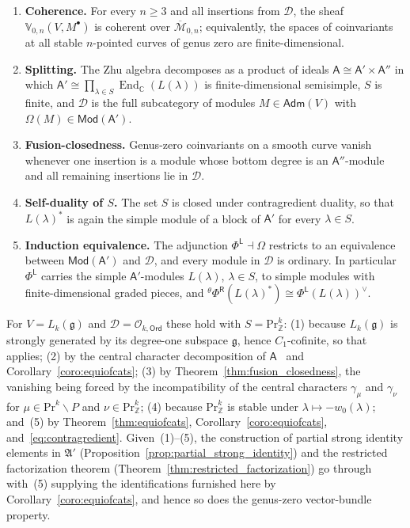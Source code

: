\documentclass[12pt,a4paper,reqno]{amsart}
\numberwithin{equation}{section}
\theoremstyle{definition}
\newcommand{\g}{\mathfrak{g}}
\newcommand{\End}{\operatorname{End}}
\newcommand{\C}{\mathbb{C}}
\newcommand{\Z}{\mathbb{Z}}
\newcommand{\M}{\mathcal{M}}
\def\O{\mathcal{O}}
\def\Ord{\mathsf{Ord}}
\def\Adm{\mathsf{Adm}}
\def\Mod{\mathsf{Mod}}
\def\L{\mathsf{L}}
\def\R{\mathsf{R}}
\def\Om{\Omega}
\def\Pr{\mathrm{Pr}}
\def\la{\lambda}
\def\bs{\backslash}
\def\fA{\mathfrak{A}}
\def\A{\mathsf{A}}
\def\VV{\mathbb{V}}
\begin{document}
\begin{enumerate}
\item[(1)] \textbf{Coherence.} For every $n\geq 3$ and all insertions from $\mathcal{D}$, the sheaf $\VV_{0,n}(V,M^\bullet)$ is coherent over $\overline{\M}_{0,n}$; equivalently, the spaces of coinvariants at all stable $n$-pointed curves of genus zero are finite-dimensional.

\item[(2)] \textbf{Splitting.} The Zhu algebra decomposes as a product of ideals $\A\cong \A'\times \A''$ in which $\A'\cong \prod_{\la\in S}\End_\C(L(\la))$ is finite-dimensional semisimple, $S$ is finite, and $\mathcal{D}$ is the full subcategory of modules $M\in\Adm(V)$ with $\Om(M)\in\Mod(\A')$.

\item[(3)] \textbf{Fusion-closedness.} Genus-zero coinvariants on a smooth curve vanish whenever one insertion is a module whose bottom degree is an $\A''$-module and all remaining insertions lie in $\mathcal{D}$.

\item[(4)] \textbf{Self-duality of $S$.} The set $S$ is closed under contragredient duality, so that $L(\la)^\ast$ is again the simple module of a block of $\A'$ for every $\la\in S$.

\item[(5)] \textbf{Induction equivalence.} The adjunction $\Phi^\L\dashv\Om$ restricts to an equivalence between $\Mod(\A')$ and $\mathcal{D}$, and every module in $\mathcal{D}$ is ordinary. In particular $\Phi^\L$ carries the simple $\A'$-modules $L(\la)$, $\la\in S$, to simple modules with finite-dimensional graded pieces, and ${}^\theta\Phi^\R(L(\la)^\ast)\cong \Phi^\L(L(\la))^\vee$.
\end{enumerate}

For $V=L_k(\g)$ and $\mathcal{D}=\O_{k,\Ord}$ these hold with $S=\Pr^k_\Z$: (1) because $L_k(\g)$ is strongly generated by its degree-one subspace $\g$, hence $C_1$-cofinite, so that~\cite{DG} applies; (2) by the central character decomposition of $\A$~\cite[Theorem 3.4]{AvE} and Corollary~\ref{coro:equiofcats}; (3) by Theorem~\ref{thm:fusion_closedness}, the vanishing being forced by the incompatibility of the central characters $\gamma_\mu$ and $\gamma_\nu$ for $\mu\in \Pr^k\bs P$ and $\nu\in \Pr_\Z^k$; (4) because $\Pr^k_\Z$ is stable under $\la\mapsto -w_0(\la)$; and~(5) by Theorem~\ref{thm:equiofcats}, Corollary~\ref{coro:equiofcats}, and~\eqref{eq:contragredient}. Given~(1)--(5), the construction of partial strong identity elements in $\fA'$ (Proposition~\ref{prop:partial_strong_identity}) and the restricted factorization theorem (Theorem~\ref{thm:restricted_factorization}) go through with~(5) supplying the identifications furnished here by Corollary~\ref{coro:equiofcats}, and hence so does the genus-zero vector-bundle property.
\end{document}
